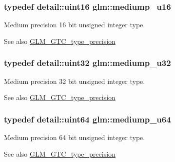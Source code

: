 \subsubsection[{mediump\+\_\+u16}]{\setlength{\rightskip}{0pt plus 5cm}typedef {\bf detail\+::uint16} {\bf glm\+::mediump\+\_\+u16}}\label{group__gtc__type__precision_ga6745262ef6a6fdb8637b2387ef924828}
Medium precision 16 bit unsigned integer type. \begin{DoxySeeAlso}{See also}
\hyperlink{group__gtc__type__precision}{G\+L\+M\+\_\+\+G\+T\+C\+\_\+type\+\_\+precision} 
\end{DoxySeeAlso}
\hypertarget{group__gtc__type__precision_gad0c27a525045c299a92306eb4cd7c13a}{}
\subsubsection[{mediump\+\_\+u32}]{\setlength{\rightskip}{0pt plus 5cm}typedef {\bf detail\+::uint32} {\bf glm\+::mediump\+\_\+u32}}\label{group__gtc__type__precision_gad0c27a525045c299a92306eb4cd7c13a}
Medium precision 32 bit unsigned integer type. \begin{DoxySeeAlso}{See also}
\hyperlink{group__gtc__type__precision}{G\+L\+M\+\_\+\+G\+T\+C\+\_\+type\+\_\+precision} 
\end{DoxySeeAlso}
\hypertarget{group__gtc__type__precision_ga00c51a16fa190b0a90205d50d6d8a44a}{}
\subsubsection[{mediump\+\_\+u64}]{\setlength{\rightskip}{0pt plus 5cm}typedef detail\+::uint64 {\bf glm\+::mediump\+\_\+u64}}\label{group__gtc__type__precision_ga00c51a16fa190b0a90205d50d6d8a44a}
Medium precision 64 bit unsigned integer type. \begin{DoxySeeAlso}{See also}
\hyperlink{group__gtc__type__precision}{G\+L\+M\+\_\+\+G\+T\+C\+\_\+type\+\_\+precision} 
\end{DoxySeeAlso}
\hypertarget{group__gtc__type__precision_gac04b372784392e82bd557f300c4de097}{}
